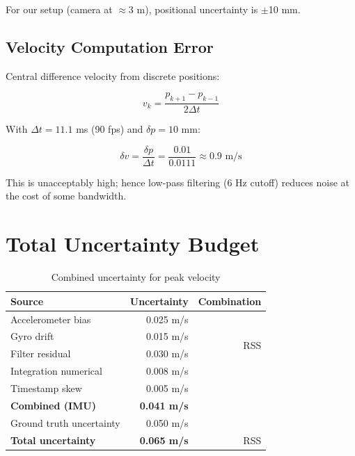 For our setup (camera at $\approx$3 m), positional uncertainty is $\pm$10 mm.

\subsection{Velocity Computation Error}

Central difference velocity from discrete positions:

\begin{equation}
    v_k = \frac{p_{k+1} - p_{k-1}}{2\Delta t}
\end{equation}

With $\Delta t = 11.1$ ms (90 fps) and $\delta p = 10$ mm:

\begin{equation}
    \delta v = \frac{\delta p}{\Delta t} = \frac{0.01}{0.0111} \approx 0.9 \text{ m/s}
\end{equation}

This is unacceptably high; hence low-pass filtering (6 Hz cutoff) reduces noise at the cost of some bandwidth.

\section{Total Uncertainty Budget}

\begin{table}[h]
    \centering
    \caption{Combined uncertainty for peak velocity}
    \label{tab:total_uncertainty_vel}
    \begin{tabular}{lrr}
        \toprule
        \textbf{Source} & \textbf{Uncertainty} & \textbf{Combination} \\
        \midrule
        Accelerometer bias & 0.025 m/s & \multirow{4}{*}{RSS} \\
        Gyro drift & 0.015 m/s & \\
        Filter residual & 0.030 m/s & \\
        Integration numerical & 0.008 m/s & \\
        Timestamp skew & 0.005 m/s & \\
        \midrule
        \textbf{Combined (IMU)} & \textbf{0.041 m/s} & \\
        Ground truth uncertainty & 0.050 m/s & \\
        \midrule
        \textbf{Total uncertainty} & \textbf{0.065 m/s} & RSS \\
        \bottomrule
    \end{tabular}
\end{table}


